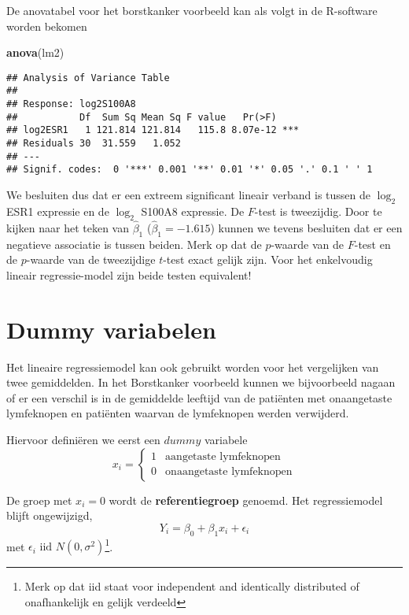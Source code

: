 \documentclass[12pt,dutch,coursenotes]{book}
\newenvironment{Shaded}{\begin{snugshade}}{\end{snugshade}}
\newcommand{\KeywordTok}[1]{\textcolor[rgb]{0.13,0.29,0.53}{\textbf{#1}}}
\newcommand{\NormalTok}[1]{#1}
\let\rmarkdownfootnote\footnote%
\def\footnote{\protect\rmarkdownfootnote}
\theoremstyle{definition}
\theoremstyle{definition}
\theoremstyle{definition}
\theoremstyle{remark}
\begin{document}
De anovatabel voor het borstkanker voorbeeld kan als volgt in de
R-software worden bekomen

\begin{Shaded}
\begin{Highlighting}[]
\KeywordTok{anova}\NormalTok{(lm2)}
\end{Highlighting}
\end{Shaded}

\begin{verbatim}
## Analysis of Variance Table
## 
## Response: log2S100A8
##           Df  Sum Sq Mean Sq F value   Pr(>F)    
## log2ESR1   1 121.814 121.814   115.8 8.07e-12 ***
## Residuals 30  31.559   1.052                     
## ---
## Signif. codes:  0 '***' 0.001 '**' 0.01 '*' 0.05 '.' 0.1 ' ' 1
\end{verbatim}

We besluiten dus dat er een extreem significant lineair verband is
tussen de \(\log_2\) ESR1 expressie en de \(\log_2\) S100A8 expressie.
De \(F\)-test is tweezijdig. Door te kijken naar het teken van
\(\hat\beta_1\) (\(\hat\beta_1=-1.615\)) kunnen we tevens besluiten dat
er een negatieve associatie is tussen beiden. Merk op dat de
\(p\)-waarde van de \(F\)-test en de \(p\)-waarde van de tweezijdige
\(t\)-test exact gelijk zijn. Voor het enkelvoudig lineair
regressie-model zijn beide testen equivalent!

\section{Dummy variabelen}\label{sec:linDummy}

Het lineaire regressiemodel kan ook gebruikt worden voor het vergelijken
van twee gemiddelden. In het Borstkanker voorbeeld kunnen we
bijvoorbeeld nagaan of er een verschil is in de gemiddelde leeftijd van
de patiënten met onaangetaste lymfeknopen en patiënten waarvan de
lymfeknopen werden verwijderd.

Hiervoor definiëren we eerst een \(dummy\) variabele
\[x_i = \left\{ \begin{array}{ll}
1 & \text{aangetaste lymfeknopen} \\
0 & \text{onaangetaste lymfeknopen} \end{array}\right.\]

De groep met \(x_i=0\) wordt de \textbf{referentiegroep} genoemd. Het
regressiemodel blijft ongewijzigd,
\[Y_i = \beta_0 + \beta_1 x_i +\epsilon_i\] met
\(\epsilon_i \text{ iid } N(0,\sigma^2)\)\footnote{Merk op dat iid staat
  voor independent and identically distributed of onafhankelijk en
  gelijk verdeeld}.
\end{document}
